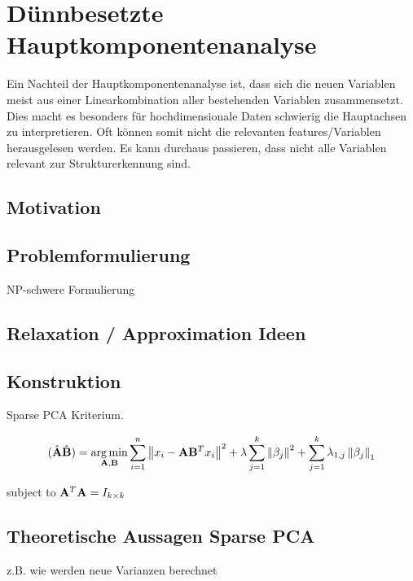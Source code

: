 \chapter{Dünnbesetzte Hauptkomponentenanalyse}

\label{sparse_pca}

Ein Nachteil der Hauptkomponentenanalyse ist, dass sich die neuen Variablen meist aus einer Linearkombination aller bestehenden Variablen zusammensetzt. Dies macht es besonders für hochdimensionale Daten schwierig die Hauptachsen zu interpretieren. Oft können somit nicht die relevanten features/Variablen herausgelesen werden. Es kann durchaus passieren, dass nicht alle Variablen relevant zur Strukturerkennung sind. 

\section{Motivation}

\section{Problemformulierung}
NP-schwere Formulierung

\section{Relaxation / Approximation Ideen}

\section{Konstruktion}

Sparse PCA Kriterium.

$$(\hat{\mathbf{A}}\hat{\mathbf{B}}) = \operatorname*{arg\,min}_{\mathbf{A}, \mathbf{B}} \sum_{i=1}^{n} \left\lVert x_i - \mathbf{A}\mathbf{B}^Tx_i \right\rVert^2 + \lambda \sum_{j=1}^{k}\left\lVert \beta_j \right\rVert^2 + \sum_{j=1}^k \lambda_{1,j} \left\lVert \beta_j \right\rVert_1$$

subject to $\mathbf{A}^T\mathbf{A} = I_{k \times k}$

\section{Theoretische Aussagen Sparse PCA}
z.B. wie werden neue Varianzen berechnet